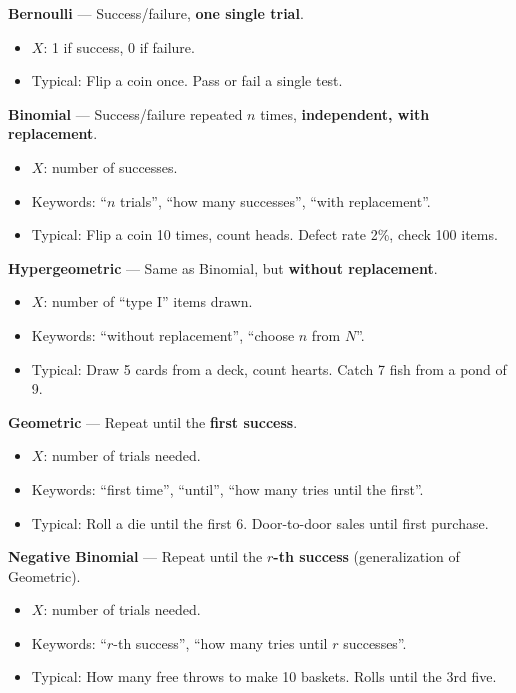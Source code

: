 \documentclass{article}
\theoremstyle{remark}
\newlength{\subsecindent}
\newenvironment{secbody}{%
  \begin{list}{}{%
    \setlength{\leftmargin}{\subsecindent}%
    \setlength{\rightmargin}{0pt}%
    \setlength{\topsep}{0pt}%
    \setlength{\partopsep}{0pt}%
    \setlength{\parsep}{\parskip}%
    \setlength{\itemsep}{\parskip}%
  }\item\relax
}{\end{list}}
\begin{document}
\begin{secbody}

\textbf{Bernoulli} --- Success/failure, \textbf{one single trial}.
\begin{itemize}
  \item $X$: 1 if success, 0 if failure.
  \item Typical: Flip a coin once. Pass or fail a single test.
\end{itemize}

\textbf{Binomial} --- Success/failure repeated $n$ times, \textbf{independent, with replacement}.
\begin{itemize}
  \item $X$: number of successes.
  \item Keywords: ``$n$ trials'', ``how many successes'', ``with replacement''.
  \item Typical: Flip a coin 10 times, count heads. Defect rate 2\%, check 100 items.
\end{itemize}

\textbf{Hypergeometric} --- Same as Binomial, but \textbf{without replacement}.
\begin{itemize}
  \item $X$: number of ``type I'' items drawn.
  \item Keywords: ``without replacement'', ``choose $n$ from $N$''.
  \item Typical: Draw 5 cards from a deck, count hearts. Catch 7 fish from a pond of 9.
\end{itemize}

\textbf{Geometric} --- Repeat until the \textbf{first success}.
\begin{itemize}
  \item $X$: number of trials needed.
  \item Keywords: ``first time'', ``until'', ``how many tries until the first''.
  \item Typical: Roll a die until the first 6. Door-to-door sales until first purchase.
\end{itemize}

\textbf{Negative Binomial} --- Repeat until the \textbf{$r$-th success} (generalization of Geometric).
\begin{itemize}
  \item $X$: number of trials needed.
  \item Keywords: ``$r$-th success'', ``how many tries until $r$ successes''.
  \item Typical: How many free throws to make 10 baskets. Rolls until the 3rd five.
\end{itemize}


\end{secbody}
\end{document}
